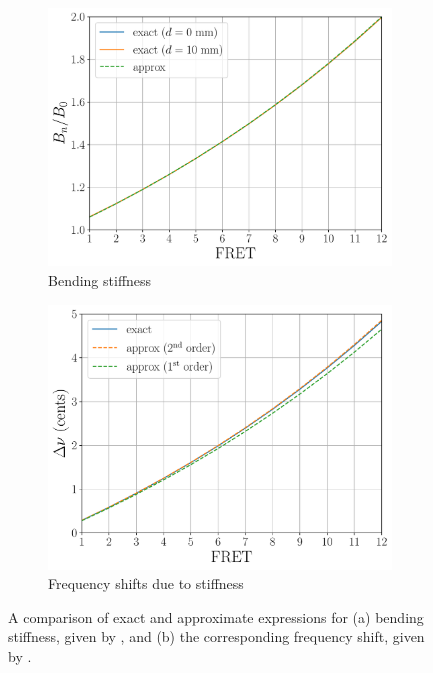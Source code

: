 \begin{figure}
  \centering
  \begin{subfigure}[b]{0.8\textwidth}
      \centering
      \includegraphics[width=5.0in]{../figures/bn_test}
      \caption{Bending stiffness}
      \label{fig:bn_test}
  \end{subfigure}
  \par\vspace{0.25in}
  \begin{subfigure}[b]{0.8\textwidth}
      \centering
      \includegraphics[width=5.0in]{../figures/bnu_test}
      \caption{Frequency shifts due to stiffness}
      \label{fig:bnu_test}
  \end{subfigure}
  \caption{\label{fig:stiffness_test} A comparison of exact and approximate expressions for (a) bending stiffness, given by , and (b) the corresponding frequency shift, given by .}
\end{figure}

